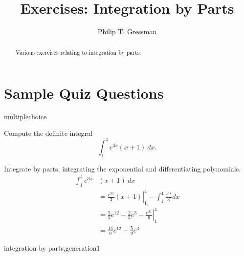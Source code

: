 \documentclass{ximera}
\title{Exercises: Integration by Parts}
\author{Philip T. Gressman}
\begin{document}
\begin{abstract}
Various exercises relating to integration by parts.
\end{abstract}
\maketitle


\section*{Sample Quiz Questions}
\begin{question}
\begin{type}
multiplechoice
\end{type}
Compute the definite integral 
\[\int_1^4 e^{3x} (x + 1) ~ dx.\]
\begin{multiplechoice}
\end{multiplechoice}
\begin{feedback}
Integrate by parts, integrating the exponential and differentiating polynomials.
\[\begin{aligned}
    \int_1^4 e^{3x} &  (x + 1) ~ dx \\
    & = \left. \frac{e^{3x}}{3} (x+1) \right|_1^4 - \int_1^4 \frac{e^{3x}}{3} dx \\
    & = \frac{5}{3} e^{12} - \frac{2}{3} e^{3} - \left. \frac{e^{3x}}{9} \right|_1^4 \\
    & = \frac{14}{9} e^{12} - \frac{5}{9} e^{3}
\end{aligned}\]
\end{feedback}
\begin{keywords}
integration by parts,generation1
\end{keywords}
\end{question}
\end{document}
